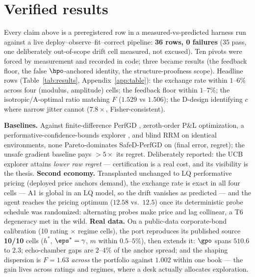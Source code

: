 \documentclass{article}
\begin{document}
\section{Verified results}
\label{sec:experiments}

Every claim above is a preregistered row in a measured-vs-predicted harness run against a live deploy--observe--fit--correct pipeline: \textbf{36 rows, 0 failures} (35 pass, one deliberately out-of-scope drift cell measured, not excused). Ten pivots were forced by measurement and recorded in code; three became results (the feedback floor, the false $\hpo$-anchored identity, the structure-proofness scope). Headline rows (Table~\ref{tab:results}, Appendix~\ref{app:table}): the exchange rate within $1$--$6\%$ across four (modulus, amplitude) cells; the feedback floor within $1$--$7\%$; the isotropic/A-optimal ratio matching $F$ ($1.529$ vs $1.506$); the D-design identifying $c$ where narrow jitter cannot ($7.8\times$, Fisher-consistent).



\textbf{Baselines.} Against finite-difference PerfGD \citep{izzo2021learn}, zeroth-order P\&L optimization, a performative-confidence-bounds explorer \citep{jagadeesan2022regret}, and blind RRM on identical environments, none Pareto-dominates SafeD-PerfGD on (final error, regret); the unsafe gradient baseline pays $>5\times$ its regret. Deliberately reported: the UCB explorer attains \emph{lower raw regret} --- certification is a real cost, and its visibility is the thesis. \textbf{Second economy.} Transplanted unchanged to LQ performative pricing (deployed price anchors demand), the exchange rate is exact in all four cells --- A1 is global in an LQ model, so the drift vanishes as predicted --- and the agent reaches the pricing optimum ($12.58$ vs.\ $12.5$) once its deterministic probe schedule was randomized: alternating probes make price and lag collinear, a T6 degeneracy met in the wild. \textbf{Real data.} On a public-data corporate-bond calibration (10 rating $\times$ regime cells), the port reproduces its published source \textbf{10/10} cells ($h^*$, $\eps^* = \gamma$, $m$ within $0.5$--$5\%$), then extends it: $\gpo$ spans $510.6$ to $2.3$; echo-chamber gaps are $2$--$4\%$ of the anchor spread; and the shaping dispersion is $F = 1.63$ \emph{across} the portfolio against $1.002$ within one book --- the gain lives across ratings and regimes, where a desk actually allocates exploration.
\end{document}

